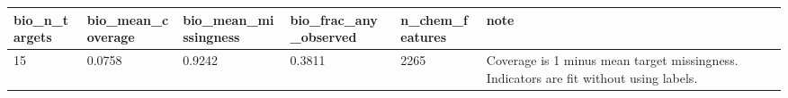 \begin{tabular}{llllll}
\hline
bio\_n\_targets & bio\_mean\_coverage & bio\_mean\_missingness & bio\_frac\_any\_observed & n\_chem\_features & note \\
\hline
15 & 0.0758 & 0.9242 & 0.3811 & 2265 & Coverage is 1 minus mean target missingness. Indicators are fit without using labels. \\
\hline
\end{tabular}
